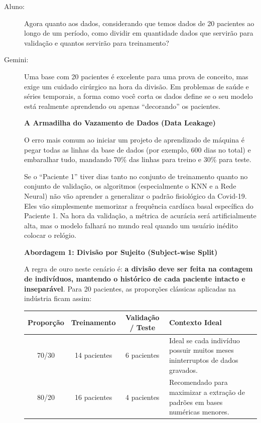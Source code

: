 \begin{description}
    \item[Aluno:] Agora quanto aos dados, considerando que temos dados de 20 pacientes ao longo de um período, como dividir em quantidade dados que servirão para validação e quantos servirão para treinamento?

    \item[Gemini:] Uma base com 20 pacientes é excelente para uma prova de conceito, mas exige um cuidado cirúrgico na hora da divisão. Em problemas de saúde e séries temporais, a forma como você corta os dados define se o seu modelo está realmente aprendendo ou apenas ``decorando'' os pacientes.

    \textbf{A Armadilha do Vazamento de Dados (Data Leakage)}

    O erro mais comum ao iniciar um projeto de aprendizado de máquina é pegar todas as linhas da base de dados (por exemplo, 600 dias no total) e embaralhar tudo, mandando 70\% das linhas para treino e 30\% para teste.

    Se o ``Paciente 1'' tiver dias tanto no conjunto de treinamento quanto no conjunto de validação, os algoritmos (especialmente o KNN e a Rede Neural) não vão aprender a generalizar o padrão fisiológico da Covid-19. Eles vão simplesmente memorizar a frequência cardíaca basal específica do Paciente 1. Na hora da validação, a métrica de acurácia será artificialmente alta, mas o modelo falhará no mundo real quando um usuário inédito colocar o relógio.

    \textbf{Abordagem 1: Divisão por Sujeito (Subject-wise Split)}

    A regra de ouro neste cenário é: \textbf{a divisão deve ser feita na contagem de indivíduos, mantendo o histórico de cada paciente intacto e inseparável}. Para 20 pacientes, as proporções clássicas aplicadas na indústria ficam assim:

    \begin{center}
    \begin{tabular}{|c|c|c|p{7cm}|}
        \hline
        \textbf{Proporção} & \textbf{Treinamento} & \textbf{Validação / Teste} & \textbf{Contexto Ideal} \\
        \hline
        70/30 & 14 pacientes & 6 pacientes & Ideal se cada indivíduo possuir muitos meses ininterruptos de dados gravados. \\
        \hline
        80/20 & 16 pacientes & 4 pacientes & Recomendado para maximizar a extração de padrões em bases numéricas menores. \\
        \hline
    \end{tabular}
    \end{center}


\end{description}
